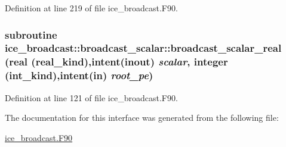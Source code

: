 Definition at line 219 of file ice\_\-broadcast.F90.\hypertarget{interfaceice__broadcast_1_1broadcast__scalar_a0303b35ac8394e9cffec964d131f260b}{
\subsubsection[{broadcast\_\-scalar\_\-real}]{\setlength{\rightskip}{0pt plus 5cm}subroutine ice\_\-broadcast::broadcast\_\-scalar::broadcast\_\-scalar\_\-real (real (real\_\-kind),intent(inout) {\em scalar}, \/  integer (int\_\-kind),intent(in) {\em root\_\-pe})}}
\label{interfaceice__broadcast_1_1broadcast__scalar_a0303b35ac8394e9cffec964d131f260b}


Definition at line 121 of file ice\_\-broadcast.F90.

The documentation for this interface was generated from the following file:\begin{DoxyCompactItemize}
\item 
\hyperlink{ice__broadcast_8F90}{ice\_\-broadcast.F90}\end{DoxyCompactItemize}
